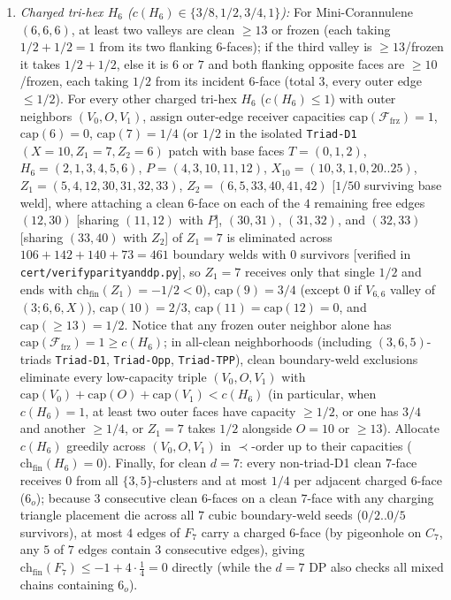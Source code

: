 \documentclass[11pt,reqno]{amsart}
\theoremstyle{plain}
\theoremstyle{definition}
\theoremstyle{remark}
\newcommand{\chf}{\mathrm{ch}_{\mathrm{fin}}}
\newcommand{\Ffrz}{\mathcal{F}_{\mathrm{frz}}}
\newcommand{\capf}{\mathrm{cap}}
\DeclareRobustCommand{\_}{\ifmmode\text{\textunderscore}\else\textunderscore\allowbreak\fi}
\begin{document}
\begin{enumerate}[label=(H\arabic*),leftmargin=2.8em]
  \item \emph{Charged tri-hex $H_6$ ($c(H_6) \in \{3/8, 1/2, 3/4, 1\}$):} For Mini-Corannulene $(6,6,6)$, at least two valleys are clean $\ge 13$ or frozen (each taking $1/2 + 1/2 = 1$ from its two flanking $6$-faces); if the third valley is $\ge 13$/frozen it takes $1/2 + 1/2$, else it is $6$ or $7$ and both flanking opposite faces are $\ge 10$/frozen, each taking $1/2$ from its incident $6$-face (total $3$, every outer edge $\le 1/2$). For every other charged tri-hex $H_6$ ($c(H_6) \le 1$) with outer neighbors $(V_0, O, V_1)$, assign outer-edge receiver capacities $\capf(\Ffrz) = 1$, $\capf(6) = 0$, $\capf(7) = 1/4$ (or $1/2$ in the isolated \texttt{Triad-D1}$(X=10, Z_1=7, Z_2=6)$ patch with base faces $T=(0,1,2)$, $H_6=(2,1,3,4,5,6)$, $P=(4,3,10,11,12)$, $X_{10}=(10,3,1,0,20..25)$, $Z_1=(5,4,12,30,31,32,33)$, $Z_2=(6,5,33,40,41,42)$ [$1/50$ surviving base weld], where attaching a clean $6$-face on each of the $4$ remaining free edges $(12,30)$ [sharing $(11,12)$ with $P$], $(30,31)$, $(31,32)$, and $(32,33)$ [sharing $(33,40)$ with $Z_2$] of $Z_1 = 7$ is eliminated across $106 + 142 + 140 + 73 = 461$ boundary welds with $0$ survivors [verified in \texttt{cert/verify\_parity\_and\_dp.py}], so $Z_1 = 7$ receives only that single $1/2$ and ends with $\chf(Z_1) = -1/2 < 0$), $\capf(9) = 3/4$ (except $0$ if $V_{6,6}$ valley of $(3; 6, 6, X)$), $\capf(10) = 2/3$, $\capf(11) = \capf(12) = 0$, and $\capf(\ge 13) = 1/2$. Notice that any frozen outer neighbor alone has $\capf(\Ffrz) = 1 \ge c(H_6)$; in all-clean neighborhoods (including $(3,6,5)$-triads \texttt{Triad-D1}, \texttt{Triad-Opp}, \texttt{Triad-TPP}), clean boundary-weld exclusions eliminate every low-capacity triple $(V_0, O, V_1)$ with $\capf(V_0) + \capf(O) + \capf(V_1) < c(H_6)$ (in particular, when $c(H_6) = 1$, at least two outer faces have capacity $\ge 1/2$, or one has $3/4$ and another $\ge 1/4$, or $Z_1 = 7$ takes $1/2$ alongside $O = 10$ or $\ge 13$). Allocate $c(H_6)$ greedily across $(V_0, O, V_1)$ in $\prec$-order up to their capacities ($\chf(H_6) = 0$). Finally, for clean $d = 7$: every non-triad-D1 clean $7$-face receives $0$ from all $\{3, 5\}$-clusters and at most $1/4$ per adjacent charged $6$-face ($6_o$); because $3$ consecutive clean $6$-faces on a clean $7$-face with any charging triangle placement die across all $7$ cubic boundary-weld seeds ($0/2..0/5$ survivors), at most $4$ edges of $F_7$ carry a charged $6$-face (by pigeonhole on $C_7$, any $5$ of $7$ edges contain $3$ consecutive edges), giving $\chf(F_7) \le -1 + 4 \cdot \frac{1}{4} = 0$ directly (while the $d=7$ DP also checks all mixed chains containing $6_o$).
\end{enumerate}
\end{document}
